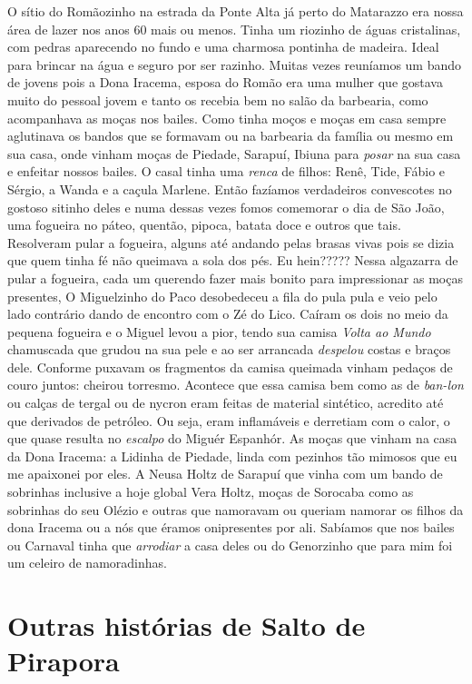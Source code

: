 \documentclass[12pt,brazil,]{book}
\begin{document}
O sítio do Romãozinho na estrada da Ponte Alta já perto do Matarazzo era
nossa área de lazer nos anos 60 mais ou menos. Tinha um riozinho de
águas cristalinas, com pedras aparecendo no fundo e uma charmosa
pontinha de madeira. Ideal para brincar na água e seguro por ser
razinho. Muitas vezes reuníamos um bando de jovens pois a Dona Iracema,
esposa do Romão era uma mulher que gostava muito do pessoal jovem e
tanto os recebia bem no salão da barbearia, como acompanhava as moças
nos bailes. Como tinha moços e moças em casa sempre aglutinava os bandos
que se formavam ou na barbearia da família ou mesmo em sua casa, onde
vinham moças de Piedade, Sarapuí, Ibiuna para \emph{posar} na sua casa e
enfeitar nossos bailes. O casal tinha uma \emph{renca} de filhos: Renê,
Tide, Fábio e Sérgio, a Wanda e a caçula Marlene. Então fazíamos
verdadeiros convescotes no gostoso sitinho deles e numa dessas vezes
fomos comemorar o dia de São João, uma fogueira no páteo, quentão,
pipoca, batata doce e outros que tais. Resolveram pular a fogueira,
alguns até andando pelas brasas vivas pois se dizia que quem tinha fé
não queimava a sola dos pés. Eu hein????? Nessa algazarra de pular a
fogueira, cada um querendo fazer mais bonito para impressionar as moças
presentes, O Miguelzinho do Paco desobedeceu a fila do pula pula e veio
pelo lado contrário dando de encontro com o Zé do Lico. Caíram os dois
no meio da pequena fogueira e o Miguel levou a pior, tendo sua camisa
\emph{Volta ao Mundo} chamuscada que grudou na sua pele e ao ser
arrancada \emph{despelou} costas e braços dele. Conforme puxavam os
fragmentos da camisa queimada vinham pedaços de couro juntos: cheirou
torresmo. Acontece que essa camisa bem como as de \emph{ban-lon} ou
calças de tergal ou de nycron eram feitas de material sintético,
acredito até que derivados de petróleo. Ou seja, eram inflamáveis e
derretiam com o calor, o que quase resulta no \emph{escalpo} do Miguér
Espanhór. As moças que vinham na casa da Dona Iracema: a Lidinha de
Piedade, linda com pezinhos tão mimosos que eu me apaixonei por eles. A
Neusa Holtz de Sarapuí que vinha com um bando de sobrinhas inclusive a
hoje global Vera Holtz, moças de Sorocaba como as sobrinhas do seu
Olézio e outras que namoravam ou queriam namorar os filhos da dona
Iracema ou a nós que éramos onipresentes por ali. Sabíamos que nos
bailes ou Carnaval tinha que \emph{arrodiar} a casa deles ou do
Genorzinho que para mim foi um celeiro de namoradinhas.

\section{Outras histórias de Salto de
Pirapora}\label{outras-histuxf3rias-de-salto-de-pirapora}
\end{document}
